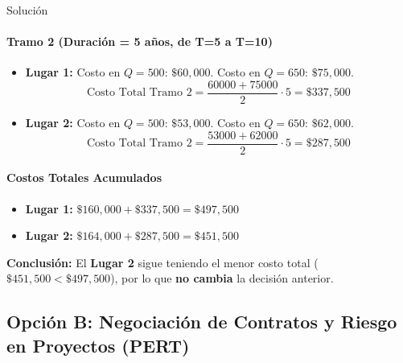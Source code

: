 \documentclass[11pt, a4paper]{article}
\begin{document}
\begin{ejercicio}{Solución}
  \paragraph{Tramo 2 (Duración = 5 años, de T=5 a T=10)}
  \begin{itemize}
    \item \textbf{Lugar 1:}
      Costo en $Q=500$: $\$60,000$. Costo en $Q=650$: $\$75,000$.
      \begin{equation*}
        \text{Costo Total Tramo 2} = \frac{60000 + 75000}{2} \cdot 5 = \$337,500
      \end{equation*}
    \item \textbf{Lugar 2:}
      Costo en $Q=500$: $\$53,000$. Costo en $Q=650$: $\$62,000$.
      \begin{equation*}
        \text{Costo Total Tramo 2} = \frac{53000 + 62000}{2} \cdot 5 = \$287,500
      \end{equation*}
  \end{itemize}

  \paragraph{Costos Totales Acumulados}
  \begin{itemize}
    \item \textbf{Lugar 1:} $\$160,000 + \$337,500 = \$497,500$
    \item \textbf{Lugar 2:} $\$164,000 + \$287,500 = \$451,500$
  \end{itemize}

  \textbf{Conclusión:} El \textbf{Lugar 2} sigue teniendo el menor costo total ($\$451,500 < \$497,500$), por lo que \textbf{no cambia} la decisión anterior.

\end{ejercicio}

\newpage

\subsection*{Opción B: Negociación de Contratos y Riesgo en Proyectos (PERT)}
\end{document}
